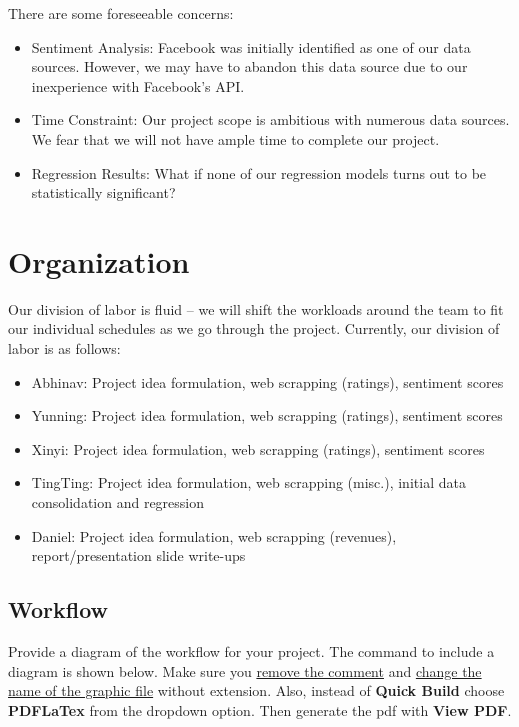 \documentclass{article}
\begin{document}
There are some foreseeable concerns:

\begin{itemize}
	\item Sentiment Analysis:  Facebook was initially identified as one of our data sources.  However, we may have to abandon this data source due to our inexperience with Facebook’s API.
	\item Time Constraint:  Our project scope is ambitious with numerous data sources.  We fear that we will not have ample time to complete our project.
	\item Regression Results:  What if none of our regression models turns out to be statistically significant?
\end{itemize}

\section{Organization}

Our division of labor is fluid – we will shift the workloads around the team to fit our individual schedules as we go through the project.  Currently, our division of labor is as follows: 

\begin{itemize}
	\item Abhinav:  Project idea formulation, web scrapping (ratings), sentiment scores
	\item Yunning:  Project idea formulation, web scrapping (ratings), sentiment scores
	\item Xinyi:  Project idea formulation, web scrapping (ratings), sentiment scores
	\item TingTing:  Project idea formulation, web scrapping (misc.), initial data consolidation and regression
	\item Daniel:  Project idea formulation, web scrapping (revenues), report/presentation slide write-ups
\end{itemize}

\subsection{Workflow}

Provide a diagram of the workflow for your project. The command to include a diagram is shown below. Make sure you \underline{remove the comment} and \underline{change the name of the graphic file} without extension. Also, instead of \textbf{Quick Build} choose \textbf{PDFLaTex} from the dropdown option. Then generate the pdf with \textbf{View PDF}.
\end{document}

